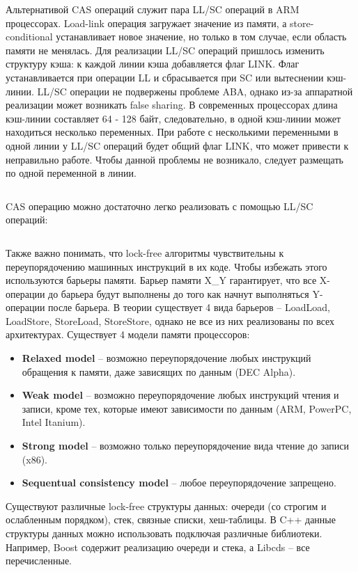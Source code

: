 Альтернативой CAS операций служит пара LL/SC операций в ARM процессорах. Load-link операция загружает значение из памяти, а store-conditional устанавливает новое значение, но только в том случае, если область памяти не менялась. Для реализации LL/SC операций пришлось изменить структуру кэша: к каждой линии кэша добавляется флаг LINK. Флаг устанавливается при операции LL и сбрасывается при SC или вытеснении кэш-линии. LL/SC операции не подвержены проблеме ABA, однако из-за аппаратной реализации может возникать false sharing. В современных процессорах длина кэш-линии составляет 64 - 128 байт, следовательно, в одной кэш-линии может находиться несколько переменных. При работе с несколькими переменными в одной линии у LL/SC операций будет общий флаг LINK, что может привести к неправильно работе. Чтобы данной проблемы не возникало, следует размещать по одной переменной в линии.

\inputminted{c++}{listings/falseSharingLLSCExample.cpp}

CAS операцию можно достаточно легко реализовать с помощью LL/SC операций:

\inputminted{c++}{listings/LLSCthroughCAS.cpp}

Также важно понимать, что lock-free алгоритмы чувствительны к переупорядочению машинных инструкций в их коде. Чтобы избежать этого используются барьеры памяти. Барьер памяти X\_Y гарантирует, что все X-операции до барьера будут выполнены до того как начнут выполняться Y-операции после барьера. В теории существует 4 вида барьеров -- LoadLoad, LoadStore, StoreLoad, StoreStore, однако не все из них реализованы по всех архитектурах. Существует 4 модели памяти процессоров: 
	
\begin{itemize}  
    \item\textbf{Relaxed model} -- возможно переупорядочение любых инструкций обращения к памяти, даже зависящих по данным (DEC Alpha).
    \item\textbf{Weak model} -- возможно переупорядочение любых инструкций чтения и записи, кроме тех, которые имеют зависимости по данным (ARM, PowerPC, Intel Itanium).
    \item\textbf{Strong model } -- возможно только переупорядочение вида чтение до записи (x86).
    \item\textbf{Sequentual consistency model} -- любое переупорядочение запрещено.
\end{itemize}

Существуют различные lock-free структуры данных: очереди (со строгим и ослабленным порядком), стек, связные списки, хеш-таблицы. В C++ данные структуры данных можно использовать подключая различные библиотеки. Например, Boost содержит реализацию очереди и стека, а Libcds -- все перечисленные.

